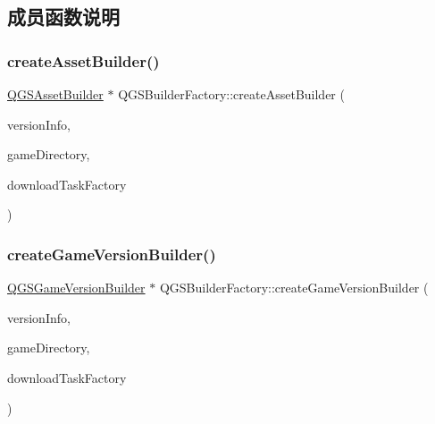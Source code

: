 \subsection{成员函数说明}
\mbox{\label{class_q_g_s_builder_factory_afab95b0e284d65834bcf3fb613d39b5a}} 
\subsubsection{\texorpdfstring{create\+Asset\+Builder()}{createAssetBuilder()}}
{\footnotesize\ttfamily \mbox{\hyperlink{class_q_g_s_asset_builder}{Q\+G\+S\+Asset\+Builder}} $\ast$ Q\+G\+S\+Builder\+Factory\+::create\+Asset\+Builder (\begin{DoxyParamCaption}\item[{\mbox{\hyperlink{class_q_g_s_game_version_info}{Q\+G\+S\+Game\+Version\+Info}} \&}]{version\+Info,  }\item[{\mbox{\hyperlink{class_q_g_s_game_directory}{Q\+G\+S\+Game\+Directory}} $\ast$}]{game\+Directory,  }\item[{\mbox{\hyperlink{class_q_g_s_download_task_factory}{Q\+G\+S\+Download\+Task\+Factory}} $\ast$}]{download\+Task\+Factory }\end{DoxyParamCaption})}

\mbox{\label{class_q_g_s_builder_factory_af266a84c6be8f7ac82f44f1d56111a6b}} 
\subsubsection{\texorpdfstring{create\+Game\+Version\+Builder()}{createGameVersionBuilder()}}
{\footnotesize\ttfamily \mbox{\hyperlink{class_q_g_s_game_version_builder}{Q\+G\+S\+Game\+Version\+Builder}} $\ast$ Q\+G\+S\+Builder\+Factory\+::create\+Game\+Version\+Builder (\begin{DoxyParamCaption}\item[{\mbox{\hyperlink{class_q_g_s_game_version_info}{Q\+G\+S\+Game\+Version\+Info}} \&}]{version\+Info,  }\item[{\mbox{\hyperlink{class_q_g_s_game_directory}{Q\+G\+S\+Game\+Directory}} $\ast$}]{game\+Directory,  }\item[{\mbox{\hyperlink{class_q_g_s_download_task_factory}{Q\+G\+S\+Download\+Task\+Factory}} $\ast$}]{download\+Task\+Factory }\end{DoxyParamCaption})}

